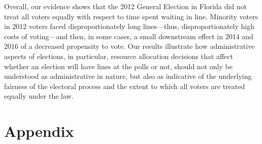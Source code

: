 \documentclass[12pt,titlepage]{article}
\begin{document}


Overall, our evidence shows that the 2012 General Election in Florida
did not treat all voters equally with respect to time spent waiting in
line.  Minority voters in 2012 voters faced disproportionately long
lines---thus, disproportionately high costs of voting---and then, in
some cases, a small downstream effect in 2014 and 2016 of a decreased
propensity to vote.  Our results illustrate how administrative aspects
of elections, in particular, resource allocation decisions that affect
whether an election will have lines at the polls or not, should not
only be understood as administrative in nature, but also as indicative
of the underlying fairness of the electoral process and the extent to
which all voters are treated equally under the law.




% 

\clearpage
\newpage




\newpage
\appendix
\section*{Appendix}


\end{document}
